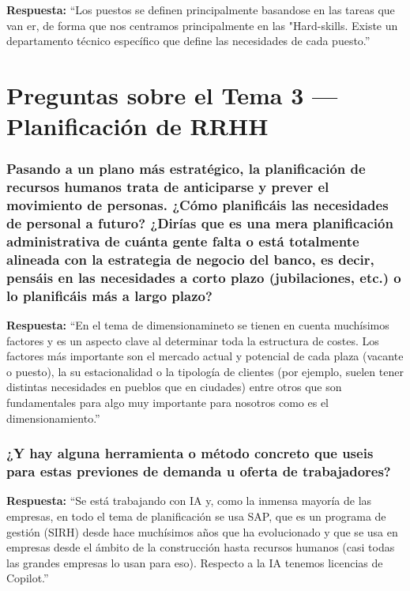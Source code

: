 \textbf{Respuesta:}\newline
``Los puestos se definen principalmente basandose en las tareas que van er, de forma que nos centramos principalmente en las "Hard-skills. Existe un departamento técnico específico que define las necesidades de cada puesto.''

\section{Preguntas sobre el Tema 3 — Planificación de RRHH}

\subsubsection*{Pasando a un plano más estratégico, la planificación de recursos humanos trata de anticiparse y prever el movimiento de personas. ¿Cómo planificáis las necesidades de personal a futuro? ¿Dirías que es una mera planificación administrativa de cuánta gente falta o está totalmente alineada con la estrategia de negocio del banco, es decir, pensáis en las necesidades a corto plazo (jubilaciones, etc.) o lo planificáis más a largo plazo?}

\textbf{Respuesta:}\newline
``En el tema de dimensionamineto se tienen en cuenta muchísimos factores y es un aspecto clave al determinar toda la estructura de costes. Los factores más importante son el mercado actual y potencial de cada plaza (vacante o puesto), la su estacionalidad o la tipología de clientes (por ejemplo, suelen tener distintas necesidades en pueblos que en ciudades) entre otros que son fundamentales para algo muy importante para nosotros como es el dimensionamiento.''

\subsubsection*{¿Y hay alguna herramienta o método concreto que useis para estas previones de demanda u oferta de trabajadores?}

\textbf{Respuesta:}\newline
``Se está trabajando con IA y, como la inmensa mayoría de las empresas, en todo el tema de planificación se usa SAP, que es un programa de gestión (SIRH) desde hace muchísimos años que ha evolucionado y que se usa en empresas desde el ámbito de la construcción hasta recursos humanos (casi todas las grandes empresas lo usan para eso). Respecto a la IA tenemos licencias de Copilot.''

